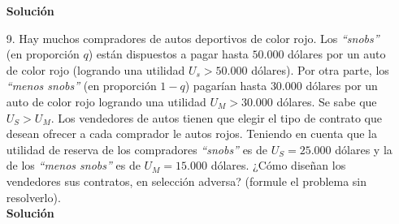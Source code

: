 \documentclass[10pt,a4paper]{article}
\begin{document}
\begin{enumerate}
			\textbf{\large Solución}\\
				
		
		\item [9.] Hay muchos compradores de autos deportivos de color rojo. Los \emph{``snobs''} (en proporción $q$) están dispuestos a pagar hasta $50.000$ dólares por un auto de color rojo (logrando una utilidad $U_{s} > 50.000$ dólares). Por otra parte, los \emph{``menos snobs''} (en proporción $1-q$) pagarían hasta $30.000$ dólares por un auto de color rojo logrando una utilidad $U_{M}>30.000$ dólares. Se sabe que $U_S > U_{M}$. Los vendedores de autos tienen que elegir el tipo de contrato que desean ofrecer a cada comprador le autos rojos. Teniendo en cuenta que la utilidad de reserva de los compradores \emph{``snobs''} es de $U_{S}=25.000$ dólares y la de los \emph{``menos snobs''} es de $U_{M}=15.000$ dólares. ¿Cómo diseñan los vendedores sus contratos, en selección adversa? (formule el problema sin resolverlo).\\
		
			\textbf{\large Solución}\\
				
	\end{enumerate}
	
\end{document}

